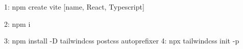 1: npm create vite
    [name, React, Typescript]

2: npm i

3: npm install -D tailwindcss postcss autoprefixer
4: npx tailwindcss init -p
